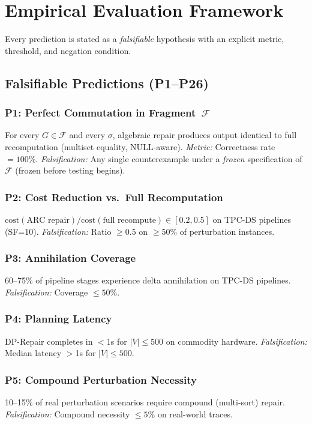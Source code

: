 \documentclass[11pt,a4paper]{article}
\theoremstyle{definition}
\newcommand{\cost}{\mathrm{cost}}
\newcommand{\FragF}{\mathcal{F}}
\begin{document}
\section{Empirical Evaluation Framework}
\label{sec:evaluation}

Every prediction is stated as a \emph{falsifiable} hypothesis with an explicit
metric, threshold, and negation condition.

\subsection{Falsifiable Predictions (P1--P26)}
\label{sec:predictions}

\subsubsection{P1: Perfect Commutation in Fragment~$\FragF$}
For every $G \in \FragF$ and every $\sigma$, algebraic repair produces output
identical to full recomputation (multiset equality, NULL-aware).
\emph{Metric:} Correctness rate $= 100\%$.
\emph{Falsification:} Any single counterexample under a \emph{frozen}
specification of~$\FragF$ (frozen before testing begins).

\subsubsection{P2: Cost Reduction vs.\ Full Recomputation}
$\cost(\text{ARC repair}) / \cost(\text{full recompute}) \in [0.2, 0.5]$
on TPC-DS pipelines (SF=10).
\emph{Falsification:} Ratio $\geq 0.5$ on $\geq$50\% of perturbation instances.

\subsubsection{P3: Annihilation Coverage}
60--75\% of pipeline stages experience delta annihilation on TPC-DS pipelines.
\emph{Falsification:} Coverage $\leq 50\%$.

\subsubsection{P4: Planning Latency}
DP-Repair completes in $<$1s for $|V| \leq 500$ on commodity hardware.
\emph{Falsification:} Median latency $>$1s for $|V| \leq 500$.

\subsubsection{P5: Compound Perturbation Necessity}
10--15\% of real perturbation scenarios require compound (multi-sort) repair.
\emph{Falsification:} Compound necessity $\leq 5\%$ on real-world traces.
\end{document}
